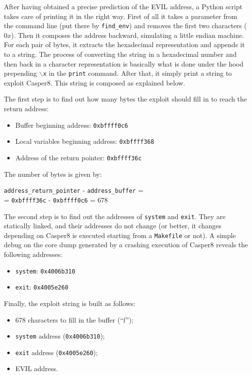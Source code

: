 After having obtained a precise prediction of the EVIL address, a Python script takes care of printing it in the right way. First of all it takes a parameter from the command line (put there by \texttt{find\_env}) and removes the first two characters ($0x$). Then it composes the address backward, simulating a little endian machine. For each pair of bytes, it extracts the hexadecimal representation and appends it to a string. The process of converting the string in a hexadecimal number and then back in a character representation is basically what is done under the hood prepending \texttt{$\backslash$x} in the \texttt{print} command. After that, it simply print a string to exploit Casper8. This string is composed as explained below.

The first step is to find out how many bytes the exploit should fill in to reach the return address:
\begin{itemize}
	\item Buffer beginning address: \texttt{0xbffff0c6}
	\item Local variables beginning address: \texttt{0xbffff368}
	\item Address of the return pointer: \texttt{0xbffff36c}
\end{itemize}
The number of bytes is given by:
\begin{center}
	\texttt{address\_return\_pointer} - \texttt{address\_buffer} =\\
	= \texttt{0xbffff36c} - \texttt{0xbffff0c6} = 678
\end{center}

The second step is to find out the addresses of \texttt{system} and \texttt{exit}. They are statically linked, and their addresses do not change (or better, it changes depending on Casper8 is executed starting from a \texttt{Makefile} or not). A simple debug on the core dump generated by a crashing execution of Casper8 reveals the following addresses:
\begin{itemize}
	\item \texttt{system}: \texttt{0x4006b310}
	\item \texttt{exit}: \texttt{0x4005e260}
\end{itemize}

Finally, the exploit string is built as follows:
\begin{itemize}
	\item 678 characters to fill in the buffer (``f'');
	\item \texttt{system} address (\texttt{0x4006b310});
	\item \texttt{exit} address (\texttt{0x4005e260});
	\item EVIL address.
\end{itemize}

